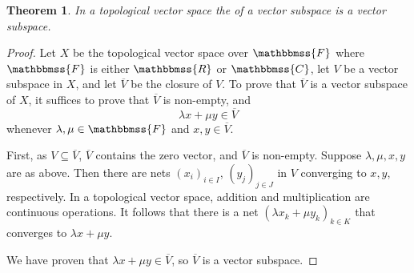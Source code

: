 \documentclass[12pt]{article}
\newcommand{\C}{\mathbbmss{C}}
\newcommand{\R}{\mathbbmss{R}}
\newtheorem{thm}{Theorem}
\begin{document}
\begin{thm} In a topological vector space 
the  of a vector subspace is a vector subspace. 
\end{thm}

\begin{proof}
Let $X$ be the topological vector space over $\mathbbmss{F}$ where 
$\mathbbmss{F}$ is either $\R$ or $\C$, let $V$ be a vector subspace
in $X$, and let $\overline{V}$ be the closure of $V$. 
To prove that $\overline{V}$
is a vector subspace of $X$, it suffices
to prove that $\overline{V}$ is non-empty, and
$$
   \lambda x + \mu y \in \overline{V}
$$
whenever $\lambda,\mu \in \mathbbmss{F}$ and $x,y\in \overline{V}$. 

First, as $V\subseteq \overline{V}$, $\overline{V}$ contains the zero vector,
and $\overline{V}$ is non-empty. 
Suppose $\lambda,\mu,x,y$ are as above. 
Then there are nets $(x_i)_{i \in I}$, $(y_j)_{j \in J}$ in $V$ converging to 
$x,y$, respectively. 
In a topological vector space, addition and multiplication are continuous
operations. It follows that there is a net $(\lambda x_k + \mu y_k)_{k \in K}$ that converges to $\lambda x + \mu y$.

We have proven that $\lambda x + \mu y \in \overline{V}$, so 
$\overline{V}$ is a vector subspace.
\end{proof}
\end{document}

